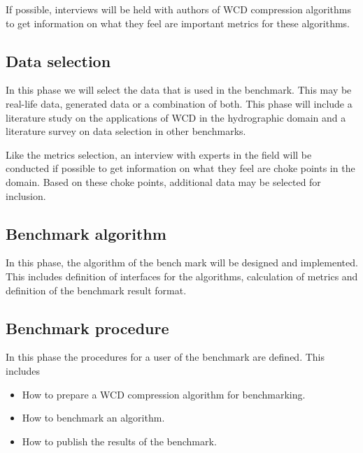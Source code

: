 If possible, interviews will be held with authors of WCD compression algorithms to get information on what they feel are important metrics for these algorithms.

\subsection{Data selection}
In this phase we will select the data that is used in the benchmark. This may be real-life data, generated data or a combination of both. This phase will include a literature study on the applications of WCD in the hydrographic domain and a literature survey on data selection in other benchmarks. 

Like the metrics selection, an interview with experts in the field will be conducted if possible to get information on what they feel are choke points in the domain. Based on these choke points, additional data may be selected for inclusion.

\subsection{Benchmark algorithm}
In this phase, the algorithm of the bench mark will be designed and implemented. This includes definition of interfaces for the algorithms, calculation of metrics and definition of the benchmark result format.

\subsection{Benchmark procedure}
In this phase the procedures for a user of the benchmark are defined. This includes
\begin{itemize}
\item How to prepare a WCD compression algorithm for benchmarking.
\item How to benchmark an algorithm.
\item How to publish the results of the benchmark.
\end{itemize}





